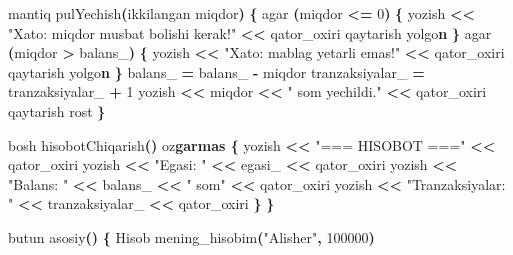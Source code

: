 \documentclass[a4paper,11pt,twoside,openright]{book}
\newenvironment{Shaded}{\begin{snugshade}}{\end{snugshade}}
\newcommand{\CharTok}[1]{\textcolor[rgb]{0.31,0.60,0.02}{#1}}
\newcommand{\DecValTok}[1]{\textcolor[rgb]{0.00,0.00,0.81}{#1}}
\newcommand{\ErrorTok}[1]{\textcolor[rgb]{0.64,0.00,0.00}{\textbf{#1}}}
\newcommand{\NormalTok}[1]{#1}
\newcommand{\OperatorTok}[1]{\textcolor[rgb]{0.81,0.36,0.00}{\textbf{#1}}}
\newcommand{\StringTok}[1]{\textcolor[rgb]{0.31,0.60,0.02}{#1}}
\newcommand{\VariableTok}[1]{\textcolor[rgb]{0.00,0.00,0.00}{#1}}
\begin{document}
\begin{Shaded}
\begin{Highlighting}[]
\NormalTok{    mantiq pulYechish}\OperatorTok{(}\NormalTok{ikkilangan miqdor}\OperatorTok{)} \OperatorTok{\{}
\NormalTok{        agar }\OperatorTok{(}\NormalTok{miqdor }\OperatorTok{\textless{}=} \DecValTok{0}\OperatorTok{)} \OperatorTok{\{}
\NormalTok{            yozish }\OperatorTok{\textless{}\textless{}} \StringTok{"Xato: miqdor musbat bo\textquotesingle{}lishi kerak!"} \OperatorTok{\textless{}\textless{}}\NormalTok{ qator\_oxiri}
\NormalTok{            qaytarish yolg}\CharTok{\textquotesingle{}o}\ErrorTok{n}
        \OperatorTok{\}}
\NormalTok{        agar }\OperatorTok{(}\NormalTok{miqdor }\OperatorTok{\textgreater{}} \VariableTok{balans\_}\OperatorTok{)} \OperatorTok{\{}
\NormalTok{            yozish }\OperatorTok{\textless{}\textless{}} \StringTok{"Xato: mablag\textquotesingle{} yetarli emas!"} \OperatorTok{\textless{}\textless{}}\NormalTok{ qator\_oxiri}
\NormalTok{            qaytarish yolg}\CharTok{\textquotesingle{}o}\ErrorTok{n}
        \OperatorTok{\}}
        \VariableTok{balans\_} \OperatorTok{=} \VariableTok{balans\_} \OperatorTok{{-}}\NormalTok{ miqdor}
        \VariableTok{tranzaksiyalar\_} \OperatorTok{=} \VariableTok{tranzaksiyalar\_} \OperatorTok{+} \DecValTok{1}
\NormalTok{        yozish }\OperatorTok{\textless{}\textless{}}\NormalTok{ miqdor }\OperatorTok{\textless{}\textless{}} \StringTok{" so\textquotesingle{}m yechildi."} \OperatorTok{\textless{}\textless{}}\NormalTok{ qator\_oxiri}
\NormalTok{        qaytarish rost}
    \OperatorTok{\}}

\NormalTok{    bosh hisobotChiqarish}\OperatorTok{()}\NormalTok{ o}\CharTok{\textquotesingle{}z}\ErrorTok{garmas \{}
\NormalTok{        yozish }\OperatorTok{\textless{}\textless{}} \StringTok{"=== HISOBOT ==="} \OperatorTok{\textless{}\textless{}}\NormalTok{ qator\_oxiri}
\NormalTok{        yozish }\OperatorTok{\textless{}\textless{}} \StringTok{"Egasi: "} \OperatorTok{\textless{}\textless{}} \VariableTok{egasi\_} \OperatorTok{\textless{}\textless{}}\NormalTok{ qator\_oxiri}
\NormalTok{        yozish }\OperatorTok{\textless{}\textless{}} \StringTok{"Balans: "} \OperatorTok{\textless{}\textless{}} \VariableTok{balans\_} \OperatorTok{\textless{}\textless{}} \StringTok{" so\textquotesingle{}m"} \OperatorTok{\textless{}\textless{}}\NormalTok{ qator\_oxiri}
\NormalTok{        yozish }\OperatorTok{\textless{}\textless{}} \StringTok{"Tranzaksiyalar: "} \OperatorTok{\textless{}\textless{}} \VariableTok{tranzaksiyalar\_} \OperatorTok{\textless{}\textless{}}\NormalTok{ qator\_oxiri}
    \OperatorTok{\}}
\OperatorTok{\}}

\NormalTok{butun asosiy}\OperatorTok{()} \OperatorTok{\{}
\NormalTok{    Hisob mening\_hisobim}\OperatorTok{(}\StringTok{"Alisher"}\OperatorTok{,} \DecValTok{100000}\OperatorTok{)}


\end{Highlighting}
\end{Shaded}
\end{document}
